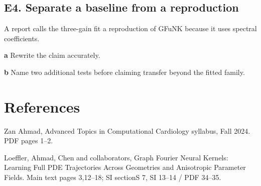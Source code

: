 \documentclass[11pt,letterpaper]{article}
\theoremstyle{definition}\newtheorem{definition}{Definition}\newtheorem{example}{Example}
\numberwithin{equation}{section}
\begin{document}
\par\noindent\begin{minipage}{\linewidth}
\subsection*{E4. Separate a baseline from a reproduction}
A report calls the three-gain fit a reproduction of GFuNK because it uses spectral coefficients.

\textbf{a} Rewrite the claim accurately.

\end{minipage}\par\medskip
\textbf{b} Name two additional tests before claiming transfer beyond the fitted family.

\section*{References}
\noindent\begin{minipage}{\linewidth}
Zan Ahmad, Advanced Topics in Computational Cardiology syllabus, Fall 2024. PDF pages 1--2.

\end{minipage}\par\medskip
\noindent\begin{minipage}{\linewidth}
Loeffler, Ahmad, Chen and collaborators, Graph Fourier Neural Kernels: Learning Full PDE Trajectories Across Geometries and Anisotropic Parameter Fields. Main text pages 3,12--18; SI sectionS 7, SI 13--14 / PDF 34--35.

\end{minipage}\par\medskip
\end{document}
